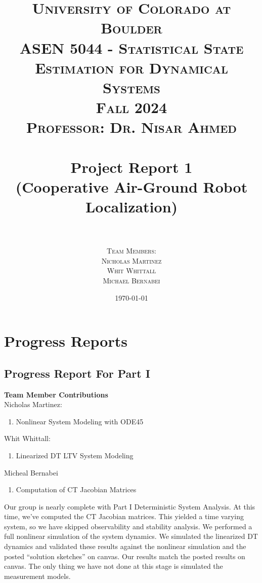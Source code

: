 \documentclass[paper=a4, fontsize=11pt]{scrartcl} %
\title{
\normalfont \LARGE
\textsc{University of Colorado at Boulder} \\ [25pt] %
\textsc{ASEN 5044 - Statistical State Estimation for Dynamical Systems} \\ [20pt]
\textsc{Fall 2024} \\ [20pt]
\textsc{Professor: Dr. Nisar Ahmed} \\ [12pt]
\horrule{1pt} \\[0.4cm] %
\huge Project Report 1 \\ %
\huge (Cooperative Air-Ground Robot Localization) \\ 
\horrule{1pt} \\[0.6cm] %
}
\author{
  \textsc{ Team Members:} \\ [4 mm]
  \textsc{ Nicholas Martinez}\\[2mm]
  \textsc{ Whit Whittall } \\[2mm]
  \textsc{ Michael Bernabei}\\[2mm]
}
\date{\normalsize\today} %
\numberwithin{equation}{section} %
\numberwithin{figure}{section} %
\numberwithin{table}{section} %
\begin{document}
\maketitle %
\thispagestyle{empty} %
\newpage

\tableofcontents

\listoffigures


\newpage

%

\section{Progress Reports}
\subsection{Progress Report For Part I}
\begin{framed}

\textbf{Team Member Contributions} \\
Nicholas Martinez:
\begin{enumerate}
    \item Nonlinear System Modeling with ODE45
\end{enumerate}
Whit Whittall:
\begin{enumerate}
    \item Linearized DT LTV System Modeling
\end{enumerate}
Micheal Bernabei
\begin{enumerate}
    \item Computation of CT Jacobian Matrices
\end{enumerate}

Our group is nearly complete with Part I Deterministic System Analysis. At this time, we’ve computed the CT Jacobian matrices. This yielded a time varying system, so we have skipped observability and stability analysis. We performed a full nonlinear simulation of the system dynamics. We simulated the linearized DT dynamics and validated these results against the nonlinear simulation and the posted “solution sketches” on canvas. Our results match the posted results on canvas. The only thing we have not done at this stage is simulated the measurement models.

\end{framed}
\end{document}
